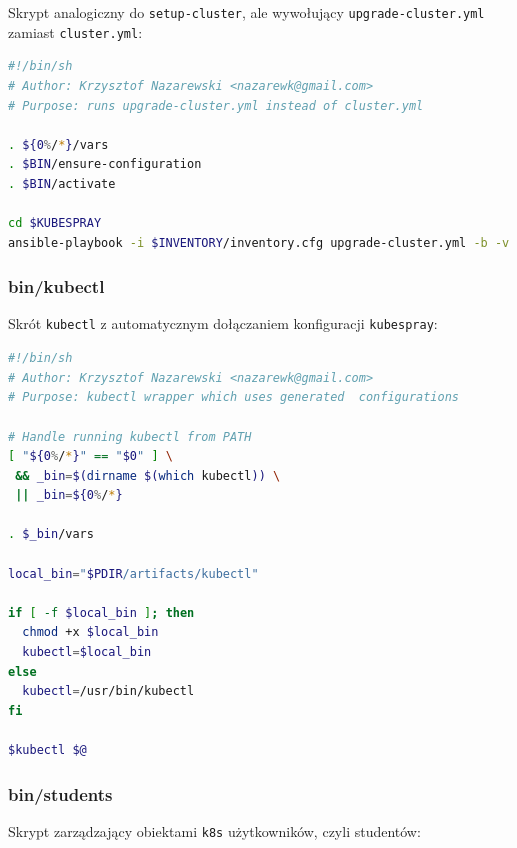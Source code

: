 \documentclass[a4paper,12pt,twoside,openany]{report}
\newcommand{\passthrough}[1]{#1}
\begin{document}
Skrypt analogiczny do \passthrough{\lstinline!setup-cluster!}, ale
wywołujący \passthrough{\lstinline!upgrade-cluster.yml!} zamiast
\passthrough{\lstinline!cluster.yml!}:

\begin{lstlisting}[language=bash]
#!/bin/sh
# Author: Krzysztof Nazarewski <nazarewk@gmail.com>
# Purpose: runs upgrade-cluster.yml instead of cluster.yml

. ${0%/*}/vars
. $BIN/ensure-configuration
. $BIN/activate

cd $KUBESPRAY
ansible-playbook -i $INVENTORY/inventory.cfg upgrade-cluster.yml -b -v $@
\end{lstlisting}

\hypertarget{binkubectl}{%
\subsubsection{bin/kubectl}\label{binkubectl}}

Skrót \passthrough{\lstinline!kubectl!} z automatycznym dołączaniem
konfiguracji \passthrough{\lstinline!kubespray!}:

\begin{lstlisting}[language=bash]
#!/bin/sh
# Author: Krzysztof Nazarewski <nazarewk@gmail.com>
# Purpose: kubectl wrapper which uses generated  configurations

# Handle running kubectl from PATH
[ "${0%/*}" == "$0" ] \
 && _bin=$(dirname $(which kubectl)) \
 || _bin=${0%/*}

. $_bin/vars

local_bin="$PDIR/artifacts/kubectl"

if [ -f $local_bin ]; then
  chmod +x $local_bin
  kubectl=$local_bin
else
  kubectl=/usr/bin/kubectl
fi

$kubectl $@
\end{lstlisting}

\hypertarget{binstudents}{%
\subsubsection{bin/students}\label{binstudents}}

Skrypt zarządzający obiektami \passthrough{\lstinline!k8s!}
użytkowników, czyli studentów:
\end{document}
